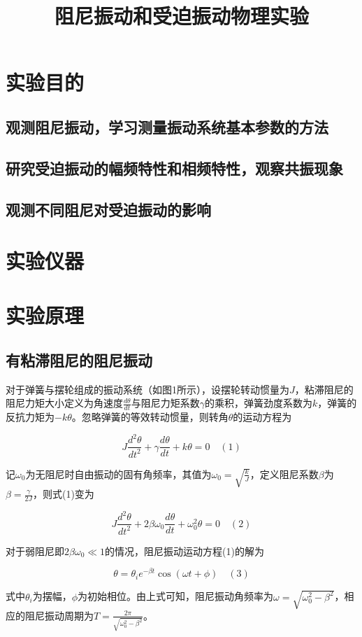 \documentclass[12pt,a4paper]{amsart}
\title{阻尼振动和受迫振动物理实验}
\begin{document}
\maketitle

\section{实验目的}
\subsection{观测阻尼振动，学习测量振动系统基本参数的方法}
\subsection{研究受迫振动的幅频特性和相频特性，观察共振现象} 
\subsection{观测不同阻尼对受迫振动的影响}
\section{实验仪器}

\section{实验原理}
\subsection{有粘滞阻尼的阻尼振动}
对于弹簧与摆轮组成的振动系统（如图1所示），设摆轮转动惯量为$J$，粘滞阻尼的阻尼力矩大小定义为角速度$\frac{d\theta}{dt}$与阻尼力矩系数$\gamma$的乘积，弹簧劲度系数为$k$，弹簧的反抗力矩为$-k\theta$。忽略弹簧的等效转动惯量，则转角$\theta$的运动方程为

\[
J\frac{d^2\theta}{dt^2} + \gamma\frac{d\theta}{dt} + k\theta = 0 \quad (1)
\]

记$\omega_0$为无阻尼时自由振动的固有角频率，其值为$\omega_0 = \sqrt{\frac{k}{J}}$，定义阻尼系数$\beta$为$\beta = \frac{\gamma}{2J}$，则式(1)变为

\[
J\frac{d^2\theta}{dt^2} + 2\beta\omega_0\frac{d\theta}{dt} + \omega_0^2\theta = 0 \quad (2)
\]

对于弱阻尼即$2\beta\omega_0 \ll 1$的情况，阻尼振动运动方程(1)的解为

\[
\theta = \theta_i e^{-\beta t}\cos(\omega t + \phi) \quad (3)
\]

式中$\theta_i$为摆幅，$\phi$为初始相位。由上式可知，阻尼振动角频率为$\omega = \sqrt{\omega_0^2 - \beta^2}$，相应的阻尼振动周期为$T = \frac{2\pi}{\sqrt{\omega_0^2 - \beta^2}}$。
\end{document}
